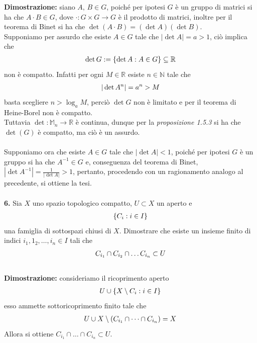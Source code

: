 \documentclass{article}
\begin{document}
\textbf{Dimostrazione:} siano $A,\, B \in G$, poiché per ipotesi $G$ è un gruppo di matrici si ha che $A \cdot B \in G$, dove $\cdot : G \times G \longrightarrow G$ è il prodotto di matrici, inoltre per il teorema di Binet si ha che $\det (A \cdot B) = (\det A)(\det B)$. \\
Supponiamo per assurdo che esiste $A \in G$ tale che $|\det A| = a > 1$, ciò implica che
\begin{gather}
    \det G := \{ \det A : A \in G \} \subseteq \mathbb{R} \notag
\end{gather}
non è compatto. Infatti per ogni $M \in \mathbb{R}$ esiste $n \in \mathbb{N}$ tale che
\begin{gather}
    |\det A^n| = a^n > M \notag
\end{gather}
basta scegliere $n > \log_a M$, perciò $\det G$ non è limitato e per il teorema di Heine-Borel non è compatto. \\
Tuttavia $\det : \mathbb{M}_n \longrightarrow \mathbb{R}$ è continua, dunque per la \textit{proposizione 1.5.3} si ha che $\det(G)$ è compatto, ma ciò è un assurdo. \\ \\
Supponiamo ora che esiste $A \in G$ tale che $|\det A| < 1$, poiché per ipotesi $G$ è un gruppo si ha che $A^{-1} \in G$ e, conseguenza del teorema di Binet, $|\det A^{-1}| = \frac{1}{|\det A|} > 1$, pertanto, procedendo con un ragionamento analogo al precedente, si ottiene la tesi. \\ \\
\textbf{6.} Sia $X$ uno spazio topologico compatto, $U \subset X$ un aperto e
\begin{gather}
    \{ C_i : i \in I \} \notag
\end{gather}
una famiglia di sottospazi chiusi di $X$. Dimostrare che esiste un insieme finito di indici $i_1, 1_2, \dots, i_n \in I$ tali che
\begin{gather}
    C_{i_1} \cap C_{i_2} \cap \dots C_{i_n} \subset U \notag
\end{gather} \\

\textbf{Dimostrazione:} consideriamo il ricoprimento aperto
\begin{gather}
    U \cup \{ X \setminus C_i : i \in I \} \notag
\end{gather}
esso ammette sottoricoprimento finito tale che
\begin{gather}
    U \cup X \setminus (C_{i_1} \cap \dots \cap C_{i_n}) = X \notag
\end{gather}
Allora si ottiene $C_{i_1} \cap \dots \cap C_{i_n} \subset U$.
\end{document}
